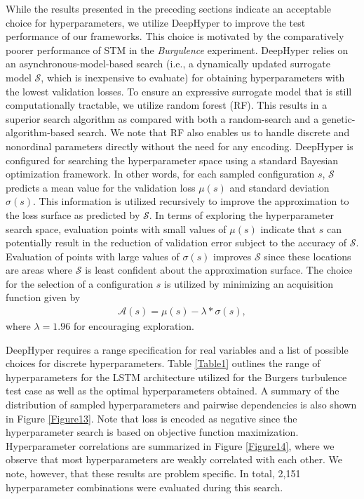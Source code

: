 \documentclass[preprint,12pt]{elsarticle}
\begin{document}
While the results presented in the preceding sections indicate an acceptable choice for hyperparameters, we utilize DeepHyper \cite{balaprakash2018deephyper} to improve the test performance of our frameworks. This choice is motivated by the comparatively poorer performance of STM in the \emph{Burgulence} experiment. DeepHyper relies on an asynchronous-model-based search (i.e., a dynamically updated surrogate model $\mathcal{S}$, which is inexpensive to evaluate) for obtaining hyperparameters with the lowest validation losses. To ensure an expressive surrogate model that is still computationally tractable, we utilize random forest (RF). This results in a superior search algorithm as compared with both a random-search and a genetic-algorithm-based search. We note that RF also enables us to handle discrete and nonordinal parameters directly without the need for any encoding. DeepHyper is configured for searching the hyperparameter space using a standard Bayesian optimization framework. In other words, for each sampled configuration $s$, $\mathcal{S}$ predicts a mean value for the validation loss $\mu(s)$ and standard deviation $\sigma(s)$. This information is utilized recursively to improve the approximation to the loss surface as predicted by $\mathcal{S}$. In terms of exploring the hyperparameter search space, evaluation points with small values of $\mu(s)$ indicate that $s$ can potentially result in the reduction of validation error subject to the accuracy of $\mathcal{S}$. Evaluation of points with large values of $\sigma(s)$ improves $\mathcal{S}$ since these locations are areas where $\mathcal{S}$ is least confident about the approximation surface. The choice for the selection of a configuration $s$ is utilized by minimizing an acquisition function given by
\begin{align}
\mathcal{A}(s)=\mu(s) - \lambda * \sigma(s),
\end{align}
where $\lambda = 1.96$ for encouraging exploration.

DeepHyper requires a range specification for real variables and a list of possible choices for discrete hyperparameters. Table \ref{Table1} outlines the range of hyperparameters for the LSTM architecture utilized for the Burgers turbulence test case as well as the optimal hyperparameters obtained. A summary of the distribution of sampled hyperparameters and pairwise dependencies is also shown in Figure \ref{Figure13}. Note that loss is encoded as negative since the hyperparameter search is based on objective function maximization. Hyperparameter correlations are summarized in Figure \ref{Figure14}, where we observe that most hyperparameters are weakly correlated with each other. We note, however,  that these results are problem specific. In total, 2,151 hyperparameter combinations were evaluated during this search.
\end{document}
